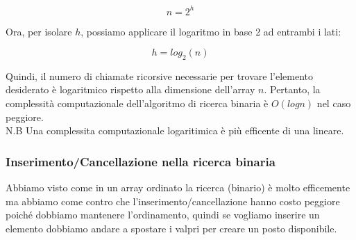 $$n = 2^h$$

Ora, per isolare $h$, possiamo applicare il logaritmo in base 2 ad entrambi i lati:

$$h = log_2(n)$$

Quindi, il numero di chiamate ricorsive necessarie per trovare l'elemento desiderato è logaritmico rispetto alla dimensione dell'array $n$. Pertanto, la complessità computazionale dell'algoritmo di ricerca binaria è $O(log n)$ nel caso peggiore.\\
N.B Una complessita computazionale logaritimica è più efficente di una lineare.

\subsubsection{Inserimento/Cancellazione nella ricerca binaria}
Abbiamo visto come in un array ordinato la ricerca (binario) è molto efficemente ma abbiamo come contro che l'inserimento/cancellazione hanno costo peggiore poiché dobbiamo mantenere l'ordinamento, quindi se vogliamo inserire un elemento dobbiamo andare a spostare i valpri per creare un posto disponibile.
